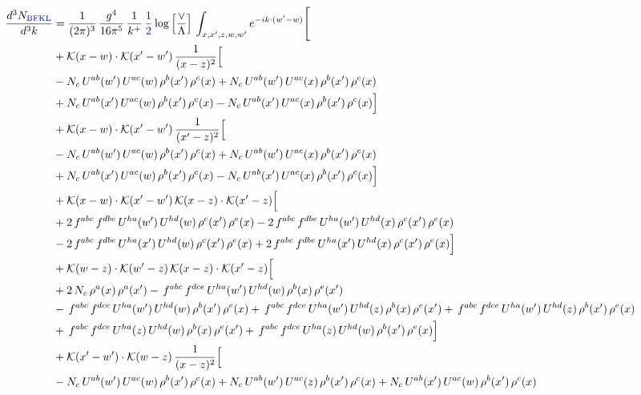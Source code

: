 \documentclass[9pt]{article}
\numberwithin{equation}{section}
\newcommand{\new}[1]{{\color{blue}#1}}
\begin{document}
\begin{align}
\frac{d^{3}N_{\new{\mathrm{BFKL}}}}{d^{3}k} & = \frac{1}{(2\pi)^{3}}\,\frac{g^{4}}{16\pi^{5}}\,\frac{1}{k^{+}}\,\new{\frac{1}{2}}\log\Big[\frac{\vee}{\Lambda}\Big]\,\int_{x,x',z,w,w'}e^{-ik\cdot(w'-w)}\Bigg[ \notag\\
& +\mathcal{K}(x-w)\cdot\mathcal{K}(x'-w')\,\frac{1}{(x-z)^{2}}\Big[\notag\\
& -N_{c}\,U^{ab}(w')\,U^{ac}(w)\,\rho^{b}(x')\,\rho^{c}(x) +N_{c}\,U^{ab}(w')\,U^{ac}(x)\,\rho^{b}(x')\,\rho^{c}(x)\notag\\
& +N_{c}\,U^{ab}(x')\,U^{ac}(w)\,\rho^{b}(x')\,\rho^{c}(x) -N_{c}\,U^{ab}(x')\,U^{ac}(x)\,\rho^{b}(x')\,\rho^{c}(x)\Big]\notag\\
& +\mathcal{K}(x-w)\cdot\mathcal{K}(x'-w')\,\frac{1}{(x'-z)^{2}}\Big[\notag\\
& -N_{c}\,U^{ab}(w')\,U^{ac}(w)\,\rho^{b}(x')\,\rho^{c}(x) +N_{c}\,U^{ab}(w')\,U^{ac}(x)\,\rho^{b}(x')\,\rho^{c}(x)\notag\\
& +N_{c}\,U^{ab}(x')\,U^{ac}(w)\,\rho^{b}(x')\,\rho^{c}(x) -N_{c}\,U^{ab}(x')\,U^{ac}(x)\,\rho^{b}(x')\,\rho^{c}(x)\Big]\notag\\
& +\mathcal{K}(x-w)\cdot\mathcal{K}(x'-w')\,\mathcal{K}(x-z)\cdot\mathcal{K}(x'-z)\Big[\notag\\
& +2\,f^{abc}\,f^{dbe}\,U^{ha}(w')\,U^{hd}(w)\,\rho^{c}(x')\,\rho^{e}(x) -2\,f^{abc}\,f^{dbe}\,U^{ha}(w')\,U^{hd}(x)\,\rho^{c}(x')\,\rho^{e}(x)\notag\\
& -2\,f^{abc}\,f^{dbe}\,U^{ha}(x')\,U^{hd}(w)\,\rho^{c}(x')\,\rho^{e}(x) +2\,f^{abc}\,f^{dbe}\,U^{ha}(x')\,U^{hd}(x)\,\rho^{c}(x')\,\rho^{e}(x)\Big]\notag\\
& +\mathcal{K}(w-z)\cdot\mathcal{K}(w'-z)\,\mathcal{K}(x-z)\cdot\mathcal{K}(x'-z)\Big[\notag\\
& +2\,N_{c}\,\rho^{a}(x)\,\rho^{a}(x') -\,f^{abc}\,f^{dce}\,U^{ha}(w')\,U^{hd}(w)\,\rho^{b}(x)\,\rho^{e}(x')\notag\\
& -\,f^{abc}\,f^{dce}\,U^{ha}(w')\,U^{hd}(w)\,\rho^{b}(x')\,\rho^{e}(x) +\,f^{abc}\,f^{dce}\,U^{ha}(w')\,U^{hd}(z)\,\rho^{b}(x)\,\rho^{e}(x') +\,f^{abc}\,f^{dce}\,U^{ha}(w')\,U^{hd}(z)\,\rho^{b}(x')\,\rho^{e}(x)\notag\\
& +\,f^{abc}\,f^{dce}\,U^{ha}(z)\,U^{hd}(w)\,\rho^{b}(x)\,\rho^{e}(x') +\,f^{abc}\,f^{dce}\,U^{ha}(z)\,U^{hd}(w)\,\rho^{b}(x')\,\rho^{e}(x)\Big]\notag\\
& +\mathcal{K}(x'-w')\cdot\mathcal{K}(w-z)\,\frac{1}{(x-z)^{2}}\Big[\notag\\
& -N_{c}\,U^{ab}(w')\,U^{ac}(w)\,\rho^{b}(x')\,\rho^{c}(x) +N_{c}\,U^{ab}(w')\,U^{ac}(z)\,\rho^{b}(x')\,\rho^{c}(x) +N_{c}\,U^{ab}(x')\,U^{ac}(w)\,\rho^{b}(x')\,\rho^{c}(x)\notag\\

\end{align}
\end{document}
